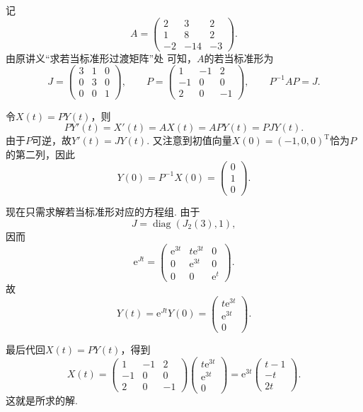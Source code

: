 \documentclass[UTF8,12pt,a4paper,fontset=fandol]{ctexart}
\begin{document}
\begin{solve}
记
    \[
        A=\begin{pmatrix}
            2 & 3 & 2 \\ 1 & 8 & 2 \\ -2 & -14 & -3
        \end{pmatrix}.
    \]
    由原讲义“求若当标准形过渡矩阵”处 可知，$A$的若当标准形为
    \[
        J=\begin{pmatrix}
            3 & 1 & 0 \\ 0 & 3 & 0 \\ 0 & 0 & 1
        \end{pmatrix},
        \qquad
        P=\begin{pmatrix}
            1 & -1 & 2 \\ -1 & 0 & 0 \\ 2 & 0 & -1
        \end{pmatrix},
        \qquad
        P^{-1}AP=J.
    \]

    令$X(t)=PY(t)$，则
    \[
        PY'(t)=X'(t)=AX(t)=APY(t)=PJY(t).
    \]
    由于$P$可逆，故$Y'(t)=JY(t)$. 又注意到初值向量$X(0)=(-1,0,0)^\mathrm{T}$恰为$P$的第二列，因此
    \[
        Y(0)=P^{-1}X(0)=\begin{pmatrix}
            0 \\ 1 \\ 0
        \end{pmatrix}.
    \]

    现在只需求解若当标准形对应的方程组. 由于
    \[
        J=\operatorname{diag}(J_2(3),1),
    \]
    因而
    \[
        \mathrm{e}^{Jt}=\begin{pmatrix}
            \mathrm{e}^{3t} & t\mathrm{e}^{3t} & 0 \\
            0 & \mathrm{e}^{3t} & 0 \\
            0 & 0 & \mathrm{e}^{t}
        \end{pmatrix}.
    \]
    故
    \[
        Y(t)=\mathrm{e}^{Jt}Y(0)=\begin{pmatrix}
            t\mathrm{e}^{3t} \\ \mathrm{e}^{3t} \\ 0
        \end{pmatrix}.
    \]

    最后代回$X(t)=PY(t)$，得到
    \[
        X(t)=\begin{pmatrix}
            1 & -1 & 2 \\ -1 & 0 & 0 \\ 2 & 0 & -1
        \end{pmatrix}\begin{pmatrix}
            t\mathrm{e}^{3t} \\ \mathrm{e}^{3t} \\ 0
        \end{pmatrix}
        =\mathrm{e}^{3t}\begin{pmatrix}
            t-1 \\ -t \\ 2t
        \end{pmatrix}.
    \]
    这就是所求的解.
\end{solve}
\end{document}
